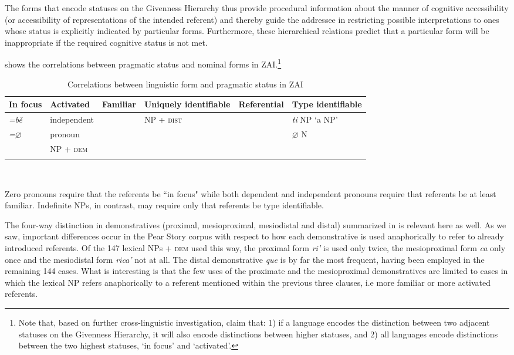 The forms that encode statuses on the Givenness Hierarchy thus provide procedural information about the manner of cognitive accessibility (or accessibility of representations of the intended referent) and thereby guide the addressee in restricting possible interpretations to ones whose status is explicitly indicated by particular forms. Furthermore, these  hierarchical relations predict that a particular form will be inappropriate if the required cognitive status is not met. 


 shows the correlations between pragmatic status and nominal forms in ZAI.\footnote{Note that, based on further cross-linguistic investigation, \citet{gundel2010} claim that: 1) if a language encodes the distinction between two adjacent statuses on the Givenness Hierarchy, it will also encode distinctions between higher statuses, and 2) all languages encode distinctions between the two highest statuses, `in focus' and `activated'.}


\begin{table}

\begin{tabularx}{\textwidth}{lllQlQ}
\lsptoprule
 {In} {focus}& {Activated} & {Familiar} & {Uniquely} {identifiable} & {Referential} & {Type} {identifiable} \\ 

 
\midrule
 \textit{=b\v{e}}  & independent &  & NP + \textsc{dist} &  & \textit{ti} NP `a NP' \\
  \textit{=$\varnothing$}  &  pronoun &  & & & {$\varnothing$ N}   \\
  & NP + \textsc{dem} & & & &  \\

\lspbottomrule
\end{tabularx}\\
\caption{{Correlations between linguistic form and pragmatic status in ZAI}}
\label{izcorrelations}

\end{table}


Zero pronouns require that the referents be ``in focus" while both dependent and independent pronouns require that referents be at least familiar. Indefinite NPs, in contrast, may require only that referents be type identifiable. 

The four-way distinction in demonstratives (proximal, mesioproximal, mesiodistal and distal) summarized in  is relevant here as well. As we saw, important differences occur in the Pear Story corpus with respect to how each demonstrative is used anaphorically to refer to already introduced referents. Of the 147 lexical NPs + \textsc{dem} used this way, the proximal form \textit{ri'} is used only twice, the mesioproximal form \textit{ca} only once and the mesiodistal form \textit{rica'} not at all. The distal demonstrative \textit{que} is by far the most frequent, having been employed in the remaining 144 cases. What is interesting is that the few uses of the proximate and the mesioproximal demonstratives are limited to cases in which the lexical NP refers anaphorically to a referent mentioned within the previous three clauses, i.e more familiar or more activated referents. 

